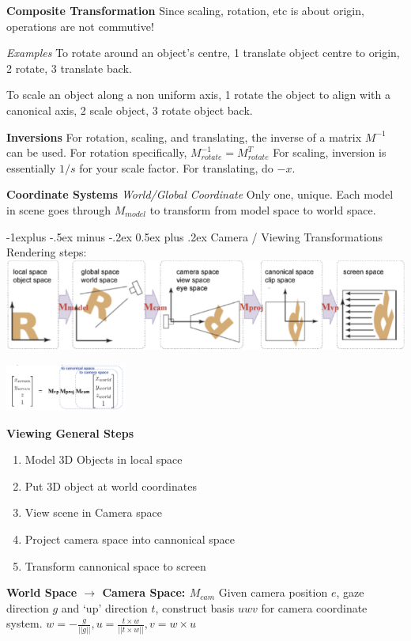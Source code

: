 \documentclass[letterpaper, 8pt]{extarticle}
\makeatletter
\renewcommand{\section}{\@startsection{section}{1}{0mm}%
                                {-1explus -.5ex minus -.2ex}%
                                {0.5ex plus .2ex}%
                                {\normalfont\small\bfseries}}
\makeatother
\begin{document}
\begin{multicols*}{4}
\textbf{Composite Transformation}
Since scaling, rotation, etc is about origin, operations are not commutive!

\textit{Examples}
To rotate around an object's centre, 1 translate object centre to origin, 2 rotate, 3 translate back.

To scale an object along a non uniform axis, 1 rotate the object to align with a canonical axis, 2 scale object, 3 rotate object back.

\textbf{Inversions}
For rotation, scaling, and translating,
the inverse of a matrix \(M^{-1}\) can be used.
For rotation specifically, \(M^{-1}_{rotate}=M^T_{rotate}\)
For scaling, inversion is essentially \(1/s\) for your scale factor.
For translating, do \(-x\).

\textbf{Coordinate Systems}
\textit{World/Global Coordinate}
Only one, unique.
Each model in scene goes through \(M_{model}\) to transform from model space to world space.

\section{Camera / Viewing Transformations}
Rendering steps:
\includegraphics[width=\linewidth]{rendering-steps.png}

\includegraphics[width=4cm]{cam-total.png}

\textbf{Viewing General Steps}
\begin{enumerate}
    \item Model 3D Objects in local space
    \item Put 3D object at world coordinates
    \item View scene in Camera space
    \item Project camera space into cannonical space
    \item Transform cannonical space to screen
\end{enumerate}

\textbf{World Space $\to$ Camera Space: $M_{cam}$}
Given camera position $e$, gaze direction $g$ and `up' direction $t$, construct basis $uwv$ for camera coordinate system.
$w = - \frac{g}{||g||}, u = \frac{t \times w}{||t \times w||}, v = w \times u$


\end{multicols*}
\end{document}
